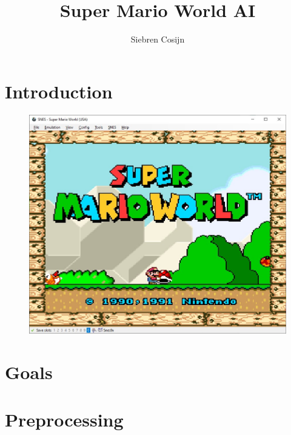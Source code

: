 \documentclass{article}
\title{Super Mario World AI}
\author{Siebren Cosijn}
\begin{document}
    \maketitle
    \section{Introduction}
    \begin{figure}[H]
    \includegraphics[width=.85\textwidth]{start-screen}
    \centering
    \end{figure}

    \section{Goals}

    \section{Preprocessing}
\end{document}
